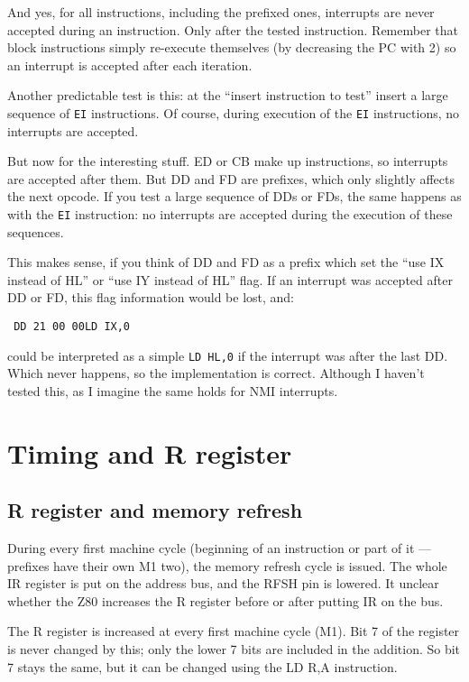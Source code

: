 \documentclass[oneside,a4paper]{book}
\begin{document}
And yes, for all instructions, including the prefixed ones, interrupts are never accepted during an instruction. Only after the tested instruction. Remember that block instructions simply re-execute themselves (by decreasing the PC with 2) so an interrupt is accepted after each iteration.

Another predictable test is this: at the ``insert instruction to test'' insert a large sequence of {\tt EI} instructions. Of course, during execution of the {\tt EI} instructions, no interrupts are accepted. 

But now for the interesting stuff. ED or CB make up instructions, so interrupts are accepted after them. But DD and FD are prefixes, which only slightly affects the next opcode. If you test a large sequence of DDs or FDs, the same happens as with the {\tt EI} instruction: no interrupts are accepted during the execution of these sequences.

This makes sense, if you think of DD and FD as a prefix which set the ``use IX instead of HL'' or ``use IY instead of HL'' flag. If an interrupt was accepted after DD or FD, this flag information would be lost, and:

{\tt
	{\qquad}DD 21 00 00{\qquad}LD IX,0
}

could be interpreted as a simple {\tt LD HL,0} if the interrupt was after the last DD. Which never happens, so the implementation is correct. Although I haven't tested this, as I imagine the same holds for NMI interrupts. 




\chapter{Timing and R register}

\section{R register and memory refresh}

During every first machine cycle (beginning of an instruction or part of it --- prefixes have their own M1 two), the memory refresh cycle is issued. The whole IR register is put on the address bus, and the RFSH pin is lowered.  It unclear whether the Z80 increases the R register before or after putting IR on the bus. 

The R register is increased at every first machine cycle (M1). Bit 7 of the register is never changed by this; only the lower 7 bits are included in the addition. So bit 7 stays the same, but it can be changed using the
{\ttfamily LD R,A} instruction.
\end{document}
